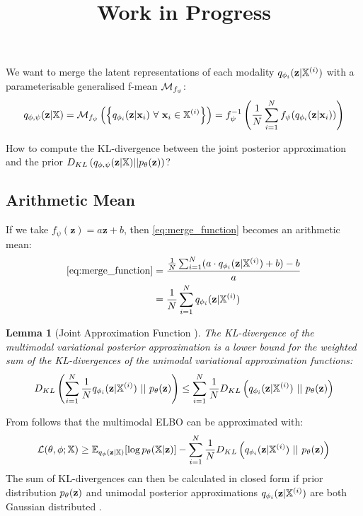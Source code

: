 \documentclass[english]{article}
\title{Work in Progress}
\date{}
\newtheorem{lemma}{Lemma}
\begin{document}
    \maketitle
    

    We want to merge the latent representations of each modality $q_{\phi_i}(\textbf{z}|\mathbb{X}^{(i)})$ with a parameterisable generalised f-mean $\mathcal{M}_{f_{\psi}}$:
        \begin{equation}\label{eq:merge_function}
        q_{\phi, \psi}(\textbf{z} | \mathbb{X}) = \mathcal{M}_{f_{\psi}}\left( \left\{ q_{\phi _i}(\textbf{z}|\textbf{x}_i)\ \forall\ \textbf{x}_i \in \mathbb{X}^{(i)} \right\} \right) = f_{\psi}^{-1}\left( \frac{1}{N} \sum ^N _{i=1} f_{\psi}(q_{\phi _i}(\textbf{z}|\textbf{x}_i)) \right)
    \end{equation}
    
    How to compute the KL-divergence between the joint posterior approximation and the prior $D_{KL} \left( q_{\phi, \psi}(\textbf{z}|\mathbb{X}) || p_{\theta}(\textbf{z}) \right)$?
    
    \subsection*{Arithmetic Mean}
    If we take $f_{\psi}(\textbf{z}) = a\textbf{z} + b$, then \cref{eq:merge_function} becomes an arithmetic mean:
    \begin{equation}
    \begin{split}
    \Cref{eq:merge_function} & = \frac{\frac{1}{N} \sum ^N _{i=1} (a \cdot \approxdistri + b) -b }{a}\\
    & = \frac{1}{N} \sum ^N _{i=1} \approxdistri
    \end{split}
    \end{equation}
    \begin{lemma}[Joint Approximation Function \citep{sutter_multimodal_2020}]\label{lemma:DklLowerBound}
    The KL-divergence of the multimodal variational posterior approximation is a lower bound for the weighted sum of the KL-divergences of the unimodal variational approximation functions:
    \begin{equation}
        D_{KL} \left( \sum _{i=1} ^N \frac{1}{N}\approxdistri\ ||\ \truedistr \right) \leq \sum _{i=1} ^N \frac{1}{N} D_{KL} \left( \approxdistri\ ||\ \truedistr \right)
    \end{equation}
    \end{lemma}
    
    From  follows that the multimodal ELBO can be approximated with:
    \begin{equation}
        \mathcal{L}(\theta, \phi; \mathbb{X}) \geq \mathbb{E}_{q_{\phi}(\textbf{z}|\mathbb{X})}[\log p_{\theta}(\mathbb{X}|\textbf{z})] - \sum _{i=1} ^N \frac{1}{N} D_{KL} \left( q_{\phi_i}(\textbf{z}|\mathbb{X}^{(i)})\ ||\ p_{\theta}(\textbf{z}) \right)
    \end{equation}
    The sum of KL-divergences can then be calculated in closed form if prior distribution $p_{\theta}(\textbf{z})$ and unimodal posterior approximations $q_{\phi_i}(\textbf{z}|\mathbb{X}^{(i)})$ are both Gaussian distributed \citep{sutter_multimodal_2020}.
    
\end{document}

